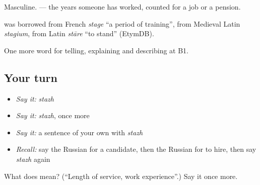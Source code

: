 Masculine. \emph{ } — the years someone has worked, counted for a job or a pension.

\begin{cousinweb}
\textbf{} was borrowed from French \emph{stage} \textquotedblleft{}a period of training\textquotedblright{}, from Medieval Latin \emph{stagium}, from Latin \emph{stāre} \textquotedblleft{}to stand\textquotedblright{} (EtymDB).
\end{cousinweb}

\begin{grammarlens}[title={What you've built}]
One more word for telling, explaining and describing at B1.
\end{grammarlens}

\subsection*{Your turn}
\begin{itemize}
\raggedright
  \item \emph{Say it:} \emph{stazh}
  \item \emph{Say it:} \emph{stazh}, once more
  \item \emph{Say it:} a sentence of your own with \emph{stazh}
  \item \emph{Recall:} say the Russian for a candidate, then the Russian for to hire, then say \emph{stazh} again
\end{itemize}

\begin{tcolorbox}[breakable,colback=teal!4,colframe=teal!35!black,title={Before you move on}]
What does  mean? (\textquotedblleft{}Length of service, work experience\textquotedblright{}.) Say it once more.
\end{tcolorbox}
